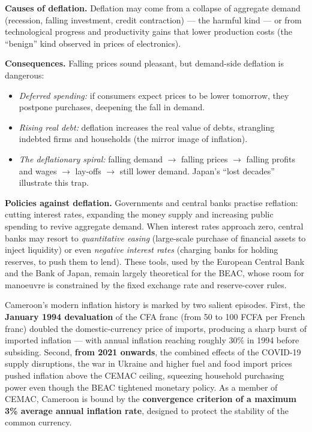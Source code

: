 \documentclass[11pt]{article}
\newcommand{\cle}[1]{{\popxbold\color{popdark}#1}}
\newcounter{popsec}
\newcounter{popsub}
\newcommand{\courssub}[1]{%
  \stepcounter{popsub}%
  \par\vspace{9pt}\noindent{\popxbold\fontsize{11.5}{13}\selectfont\color{popink}{\color{poporange}\thepopsec.\thepopsub}\hspace{6pt}#1}\par\nopagebreak\vspace{4pt}
}
\begin{document}
\textbf{Causes of deflation.} Deflation may come from a collapse of aggregate demand (recession, falling investment, credit contraction) --- the harmful kind --- or from technological progress and productivity gains that lower production costs (the ``benign'' kind observed in prices of electronics).

\textbf{Consequences.} Falling prices sound pleasant, but demand-side deflation is dangerous:
\begin{itemize}
\item \emph{Deferred spending:} if consumers expect prices to be lower tomorrow, they postpone purchases, deepening the fall in demand.
\item \emph{Rising real debt:} deflation increases the real value of debts, strangling indebted firms and households (the mirror image of inflation).
\item \emph{The deflationary spiral:} falling demand $\rightarrow$ falling prices $\rightarrow$ falling profits and wages $\rightarrow$ lay-offs $\rightarrow$ still lower demand. Japan's ``lost decades'' illustrate this trap.
\end{itemize}

\textbf{Policies against deflation.} Governments and central banks practise \cle{reflation}: cutting interest rates, expanding the money supply and increasing public spending to revive aggregate demand. When interest rates approach zero, central banks may resort to \emph{quantitative easing} (large-scale purchase of financial assets to inject liquidity) or even \emph{negative interest rates} (charging banks for holding reserves, to push them to lend). These tools, used by the European Central Bank and the Bank of Japan, remain largely theoretical for the BEAC, whose room for manoeuvre is constrained by the fixed exchange rate and reserve-cover rules.

\courssub{The Cameroonian Context}

\begin{savaistu}
Cameroon's modern inflation history is marked by two salient episodes. First, the \textbf{January 1994 devaluation} of the CFA franc (from 50 to 100 FCFA per French franc) doubled the domestic-currency price of imports, producing a sharp burst of imported inflation --- with annual inflation reaching roughly 30\% in 1994 before subsiding. Second, \textbf{from 2021 onwards}, the combined effects of the COVID-19 supply disruptions, the war in Ukraine and higher fuel and food import prices pushed inflation above the CEMAC ceiling, squeezing household purchasing power even though the BEAC tightened monetary policy. As a member of CEMAC, Cameroon is bound by the \textbf{convergence criterion of a maximum 3\% average annual inflation rate}, designed to protect the stability of the common currency.
\end{savaistu}
\end{document}
